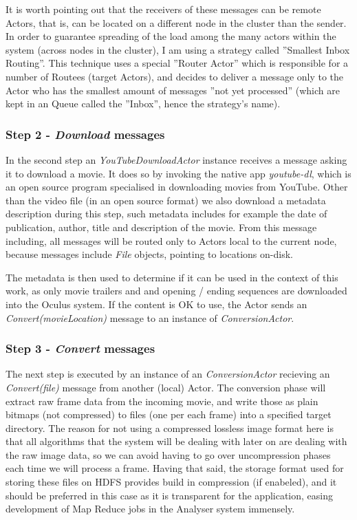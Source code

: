 It is worth pointing out that the receivers of these messages can be remote Actors, that is, can be located on a different node in the cluster than the sender. In order to guarantee spreading of the load among the many actors within the system (across nodes in the cluster), I am using a strategy called ''Smallest Inbox Routing''. This technique uses a special ''Router Actor'' which is responsible for a number of Routees (target Actors), and decides to deliver a message only to the Actor who has the smallest amount of messages ''not yet processed'' (which are kept in an Queue called the ''Inbox'', hence the strategy's name).

\subsubsection{Step 2 - \textit{Download} messages}
In the second step an \textit{YouTubeDownloadActor} instance receives a message asking it to download a movie.
It does so by invoking the native app \textit{youtube-dl}, which is an open source program specialised in downloading movies from YouTube.
Other than the video file (in an open source format) we also download a metadata description during this step, such metadata includes for example the date of publication, author, title and description of the movie. From this message including, all messages will be routed only to Actors local to the current node, because messages include \textit{File} objects, pointing to locations on-disk.

The metadata is then used to determine if it can be used in the context of this work, as only movie trailers and and opening / ending sequences are downloaded into the Oculus system. If the content is OK to use, the Actor sends an \textit{Convert(movieLocation)} message to an instance of \textit{ConversionActor}.

\subsubsection{Step 3 - \textit{Convert} messages}
The next step is executed by an instance of an \textit{ConversionActor} recieving an \textit{Convert(file)} message from another (local) Actor. The conversion phase will extract raw frame data from the incoming movie, and write those as plain bitmaps (not compressed) to files (one per each frame) into a specified target directory. The reason for not using a compressed lossless image format here is that all algorithms that the system will be dealing with later on are dealing with the raw image data, so we can avoid having to go over uncompression phases each time we will process a frame. Having that said, the storage format used for storing these files on HDFS provides build in compression (if enabeled), and it should be preferred in this case as it is transparent for the application, easing development of Map Reduce jobs in the Analyser system immensely.

